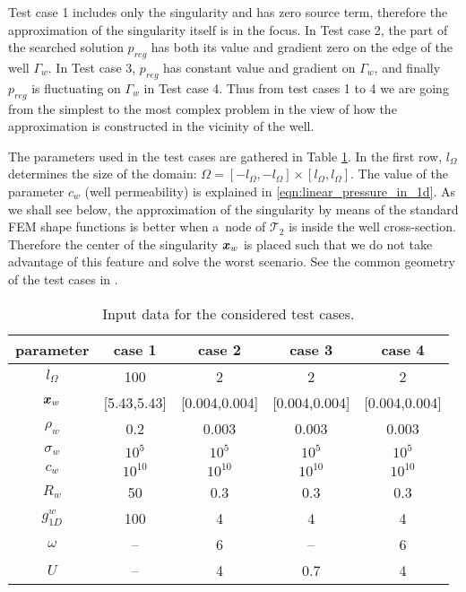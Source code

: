 %
Test case 1 includes only the singularity and has zero source term, therefore the approximation
of the singularity itself is in the focus. 
In Test case 2, the part of the searched solution $p_{reg}$ has both its value and gradient zero on the edge of the well $\Gamma_w$.
In Test case 3, $p_{reg}$ has constant value and gradient on $\Gamma_w$, and finally $p_{reg}$ is fluctuating on $\Gamma_w$ in Test case 4.
Thus from test cases 1 to 4 we are going from the simplest to the most complex problem
in the view of how the approximation is constructed in the vicinity of the well.

The parameters used in the test cases are gathered in Table \ref{tab:test_cases_data}.
In the first row, $l_\Omega$ determines the size of the domain: $\Omega=[-l_\Omega, -l_\Omega]\times[l_\Omega,l_\Omega]$.
The value of the parameter $c_w$ (well permeability) is explained in \eqref{eqn:linear_pressure_in_1d}.
As we shall see below, the approximation of the singularity by means of the standard FEM shape functions is better 
when a~node of $\mathcal{T}_{2}$ is inside the well cross-section. Therefore the center of the singularity $\mathbf{\boldsymbol{x}}_w$
is placed such that we do not take advantage of this feature and solve the worst scenario.
See the common geometry of the test cases in .
%
\begin{table}
\begin{center}
\begin{tabular}{c|cccc}
\toprule
parameter & case 1 & case 2 & case 3 & case 4 \\
\midrule
$l_\Omega$  & 100    & 2      & 2      & 2  \\ 
$\mathbf{\boldsymbol{x}}_w$     & [5.43,5.43]  & [0.004,0.004]  & [0.004,0.004]  & [0.004,0.004] \\
$\rho_w$    & 0.2    & 0.003  & 0.003  & 0.003 \\
$\sigma_w$  & $10^5$ & $10^5$ & $10^5$ & $10^5$ \\
$c_w$       & $10^{10}$ & $10^{10}$ & $10^{10}$ & $10^{10}$ \\
$R_w$       & 50     & 0.3    & 0.3    & 0.3 \\
$g^w_{1D}$  & 100    & 4      & 4      & 4  \\
$\omega$    & --     & 6      & --     & 6  \\
$U$         & --     & 4      & 0.7    & 4  \\
\bottomrule
\end{tabular}
\caption{Input data for the considered test cases.}
\label{tab:test_cases_data}
\end{center}
\end{table}
%

